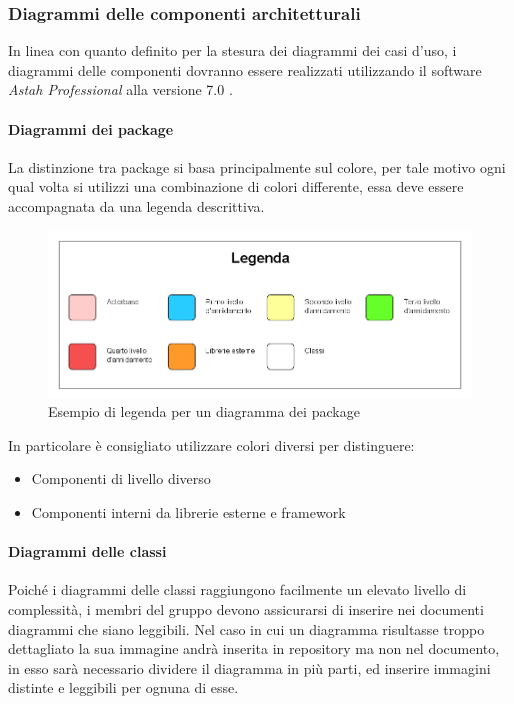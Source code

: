 \documentclass[a4paper]{article}
\begin{document}
		\subsubsection{Diagrammi delle componenti architetturali}
		In linea con quanto definito per la stesura dei diagrammi dei casi d'uso, i diagrammi delle componenti dovranno essere realizzati utilizzando il software \emph{Astah Professional} alla versione 7.0 .
		\paragraph{Diagrammi dei package} 
		La distinzione tra package si basa principalmente sul colore, per tale motivo ogni qual volta si utilizzi una combinazione di colori differente, essa deve essere accompagnata da una legenda  descrittiva.
		\begin{figure}[H]
				\centering
				\includegraphics[scale=0.5]{ST/Legenda.png}
				\caption{Esempio di legenda per un diagramma dei package}
			\end{figure}
			In particolare è consigliato utilizzare colori diversi per distinguere:
			\begin{itemize}
				\item Componenti di livello diverso
				\item Componenti interni da librerie esterne e framework
			\end{itemize}
			
		\paragraph{Diagrammi delle classi}
		Poiché i diagrammi delle classi raggiungono facilmente un elevato livello di complessità, i membri del gruppo devono assicurarsi di inserire nei documenti diagrammi che siano leggibili. Nel caso in cui un diagramma risultasse troppo dettagliato la sua immagine andrà inserita in repository ma non nel documento, in esso sarà necessario dividere il diagramma in più parti, ed inserire immagini distinte e leggibili per ognuna di esse.
		
\end{document}
